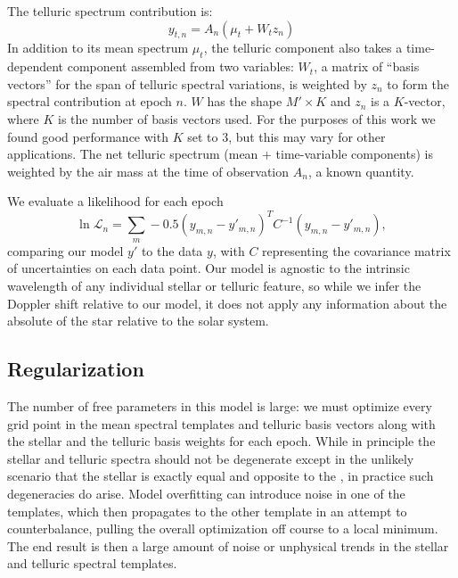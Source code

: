 \documentclass[modern]{aastex62}
\begin{document}
The telluric spectrum contribution is:
\begin{equation}
y_{t, n} =  A_n(\mu_{t} + W_{t} z_n)
\end{equation}
In addition to its mean spectrum $\mu_t$, the telluric component also takes a time-dependent component assembled from two variables: $W_t$, a matrix of ``basis vectors'' for the span of telluric spectral variations, is weighted by $z_n$ to form the spectral contribution at epoch $n$. 
$W$ has the shape $M' \times K$ and $z_n$ is a $K$-vector, where $K$ is the number of basis vectors used. 
For the purposes of this work we found good performance with $K$ set to 3, but this may vary for other applications. 
The net telluric spectrum (mean + time-variable components) is weighted by the air mass at the time of observation $A_n$, a known quantity.

We evaluate a likelihood for each epoch
\begin{equation}
\ln \mathcal{L}_n = \sum_{m} -0.5 (y_{m,n} - y'_{m,n})^T C^{-1} (y_{m,n}-y'_{m,n}),
\end{equation}
comparing our model $y'$ to the data $y$, with $C$ representing the covariance matrix of uncertainties on each data point.
Our model is agnostic to the intrinsic wavelength of any individual stellar or telluric feature, so while we infer the Doppler shift relative to our model, it does not apply any information about the absolute \RV of the star relative to the solar system. 

\subsection{Regularization}

The number of free parameters in this model is large: we must optimize every grid point in the mean spectral templates and telluric basis vectors along with the stellar \RV and the telluric basis weights for each epoch. 
While in principle the stellar and telluric spectra should not be degenerate except in the unlikely scenario that the stellar \RV is exactly equal and opposite to the \BERV, in practice such degeneracies do arise. 
Model overfitting can introduce noise in one of the templates, which then propagates to the other template in an attempt to counterbalance, pulling the overall optimization off course to a local minimum. 
The end result is then a large amount of noise or unphysical trends in the stellar and telluric spectral templates. 
\end{document}
